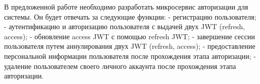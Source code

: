 В предложенной работе необходимо разработать микросервис авторизации для системы. Он будет отвечать за следующие функции: 
- регистрацию пользователя; 
- аутентификацию и авторизацию пользователя с выдачей двух JWT (refresh, access); 
- обновление access JWT с помощью refresh JWT; 
- завершение сессии пользователя путем аннулирования двух JWT (refresh, access); 
- предоставление персональной информации пользователя после прохождения этапа авторизации;
- удаление пользователем своего личного аккаунта после прохождения этапа авторизации.


